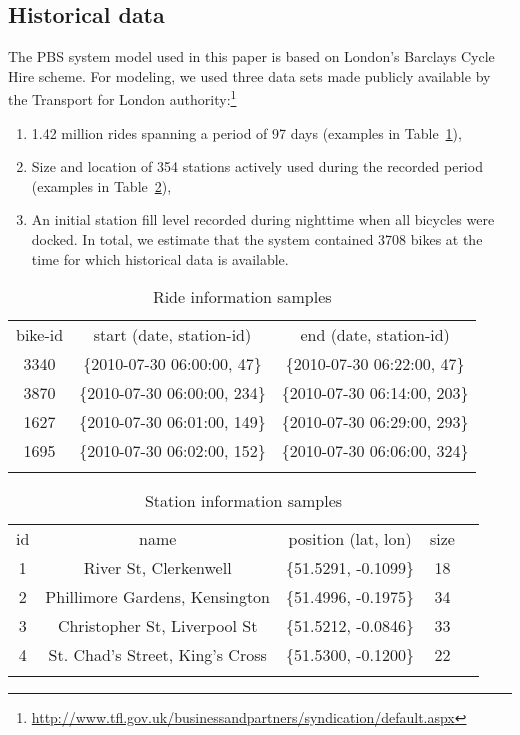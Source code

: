 \documentclass{article}
\begin{document}
\subsection{Historical data}
The PBS system model used in this paper is based on London's Barclays Cycle Hire
scheme. For modeling, we used three data sets made publicly available by the
Transport for London
authority:\footnote{\url{http://www.tfl.gov.uk/businessandpartners/syndication/default.aspx}}
\begin{enumerate}
\item 1{.}42 million rides spanning a period of 97 days (examples in
  Table~\ref{tab:ride-format}),
\item Size and location of 354 stations actively used during the recorded period
  (examples in Table~\ref{tab:stations-format}),
\item An initial station fill level recorded during nighttime when all bicycles
  were docked. In total, we estimate that the system contained 3708 bikes at
  the time for which historical data is available.
\end{enumerate}
\begin{table}
  \caption{Ride information samples}
  \label{tab:ride-format}
  \centering
  \begin{tabular}{c c c }
    \hline\noalign{\smallskip}
   bike-id & start (date, station-id) & end (date, station-id) \\
   \noalign{\smallskip}\hline\noalign{\smallskip}
    3340 & \{2010-07-30 06:00:00, 47\} & \{2010-07-30 06:22:00, 47\} \\
    3870 & \{2010-07-30 06:00:00, 234\} & \{2010-07-30 06:14:00, 203\} \\
    1627 & \{2010-07-30 06:01:00, 149\} & \{2010-07-30 06:29:00, 293\} \\
    1695 & \{2010-07-30 06:02:00, 152\} & \{2010-07-30 06:06:00, 324\} \\
    \noalign{\smallskip}\hline
  \end{tabular}
\end{table}
\begin{table}
  \caption{Station information samples}
  \label{tab:stations-format}
  \centering
  \begin{tabular}{c c c c c }
    \hline\noalign{\smallskip}
    id & name & position (lat, lon)& size\\
    \noalign{\smallskip}\hline\noalign{\smallskip}
    1 & River St, Clerkenwell & \{51.5291, -0.1099\} & 18\\
    2 & Phillimore Gardens, Kensington & \{51.4996, -0.1975\} & 34\\
    3 & Christopher St, Liverpool St & \{51.5212, -0.0846\} & 33\\
    4 & St. Chad's Street, King's Cross & \{51.5300, -0.1200\} & 22 \\
    \noalign{\smallskip}\hline
  \end{tabular}
\end{table}
\end{document}
